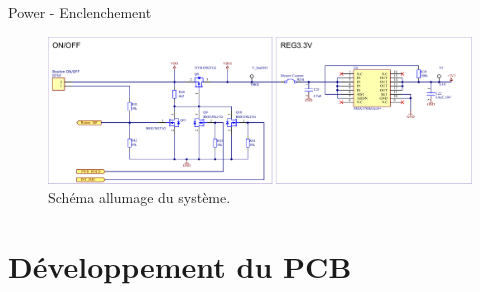 \documentclass{beamer}
\begin{document}
\begin{frame}{Power - Enclenchement}
	\begin{figure}[h]
		\centering
		\includegraphics[width=.9\linewidth]{../figures/etude/sch/ON-OFF}
		\caption{Schéma allumage du système.}
		\label{fig:on-off}
	\end{figure}
\end{frame}

\section{Développement du PCB}
\end{document}
